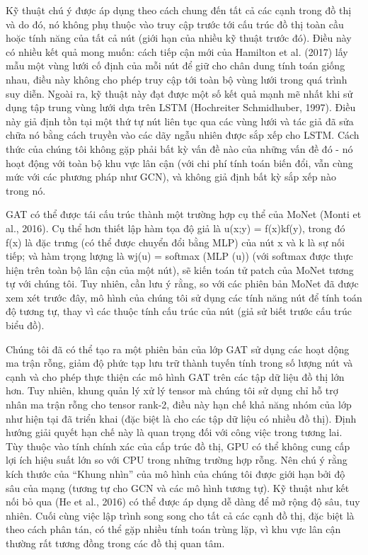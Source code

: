 Kỹ thuật chú ý được áp dụng theo cách chung đến tất cả các cạnh trong đồ thị và do đó, nó không phụ thuộc vào truy cập trước tới cấu trúc đồ thị toàn cầu hoặc tính năng của tất cả nút (giới hạn của nhiều kỹ thuật trước đó). Điều này có nhiều kết quả mong muốn: cách tiếp cận mới của Hamilton et al. (2017) lấy mẫu một vùng lưới cố định của mỗi nút để giữ cho chân dung tính toán giống nhau, điều này không cho phép truy cập tới toàn bộ vùng lưới trong quá trình suy diễn. Ngoài ra, kỹ thuật này đạt được một số kết quả mạnh mẽ nhất khi sử dụng tập trung vùng lưới dựa trên LSTM (Hochreiter  Schmidhuber, 1997). Điều này giả định tồn tại một thứ tự nút liên tục qua các vùng lưới và tác giả đã sửa chữa nó bằng cách truyền vào các dãy ngẫu nhiên được sắp xếp cho LSTM. Cách thức của chúng tôi không gặp phải bất kỳ vấn đề nào của những vấn đề đó - nó hoạt động với toàn bộ khu vực lân cận (với chi phí tính toán biến đổi, vẫn cùng mức với các phương pháp như GCN), và không giả định bất kỳ sắp xếp nào trong nó.

GAT có thể được tái cấu trúc thành một trường hợp cụ thể của MoNet (Monti et al., 2016). Cụ thể hơn thiết lập hàm tọa độ giả là u(x;y) = f(x)kf(y), trong đó f(x) là đặc trưng (có thể được chuyển đổi bằng MLP) của nút x và k là sự nối tiếp; và hàm trọng lượng là wj(u) = softmax (MLP (u)) (với softmax được thực hiện trên toàn bộ lân cận của một nút), sẽ kiến toán tử patch của MoNet tương tự với chúng tôi. Tuy nhiên, cần lưu ý rằng, so với các phiên bản MoNet đã được xem xét trước đây, mô hình của chúng tôi sử dụng các tính năng nút để tính toán độ tương tự, thay vì các thuộc tính cấu trúc của nút (giả sử biết trước cấu trúc biểu đồ).

Chúng tôi đã có thể tạo ra một phiên bản của lớp GAT sử dụng các hoạt dộng ma trận rỗng, giảm độ phức tạp lưu trữ thành tuyến tính trong số lượng nút và cạnh và cho phép thực thiện các mô hình GAT trên các tập dữ liệu đồ thị lớn hơn. Tuy nhiên, khung quản lý xử lý tensor mà chúng tôi sử dụng chỉ hỗ trợ nhân ma trận rỗng cho tensor rank-2, điều này hạn chế khả năng nhóm của lớp như hiện tại đã triển khai (đặc biệt là cho các tập dữ liệu có nhiều đồ thị). Định hướng giải quyết hạn chế này là quan trọng đối với công việc trong tương lai. Tùy thuộc vào tính chính xác của cấp trúc đồ thị, GPU có thể không cung cấp lợi ích hiệu suất lớn so với CPU trong những trường hợp rỗng. Nên chú ý rằng kích thước của “Khung nhìn” của mô hình của chúng tôi được giới hạn bởi độ sâu của mạng (tương tự cho GCN và các mô hình tương tự). Kỹ thuật như kết nối bỏ qua (He et al., 2016) có thể được áp dụng dễ dàng để mở rộng độ sâu, tuy nhiên. Cuối cùng việc lập trình song song cho tất cả các cạnh đồ thị, đặc biệt là theo cách phân tán, có thể gặp nhiều tính toán trùng lặp, vì khu vực lân cận thường rất tương đồng trong các đồ thị quan tâm.


